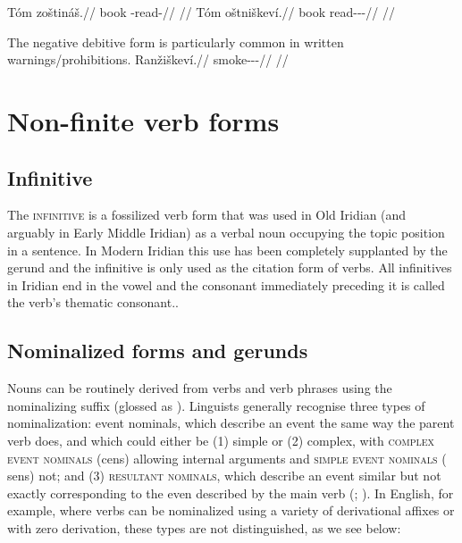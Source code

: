 \begin{multicols}{2}
  \pex
  \a
  \begingl
  \gla Tóm zoštináš.//
  \glb book \Neg{}-read-\SupN{}//
  \glft {}//
  \endgl
  \a \begingl
  \gla Tóm oštniškeví.//
  \glb book read-\Pv{}-\N{}\Deb{}-\Cont{}//
  \glft {}//
  \endgl
  \xe
\end{multicols}

The negative debitive form is particularly common in written warnings/prohibitions.
\pex \begingl
  \gla Ranžiškeví.//
  \glb smoke-\Av{}-\N{}\Deb{}-\Cont{}//
  \glft {}//
  \endgl
\xe


\section{Non-finite verb forms}

\subsection{Infinitive}\label{sec:infinitive}

The {\scshape infinitive} is a fossilized verb form that was used in Old
Iridian (and arguably in Early Middle Iridian) as a verbal noun occupying the topic position in a
sentence. In Modern Iridian this use has been completely supplanted by the
gerund and the infinitive is only used as the citation
form of verbs. All infinitives in Iridian end in the vowel
 and the consonant immediately preceding it is called the verb's
thematic consonant..

\subsection{Nominalized forms and
gerunds}\label{nom-morph}

Nouns can be routinely derived from verbs and verb phrases using the
nominalizing suffix  (glossed as \Nz{}). Linguists generally recognise
three types of nominalization: event nominals, which describe an event the same
way the parent verb does, and which could either be (1) simple or (2) complex,
with {\scshape complex event nominals} ({\sc cen}s) allowing
internal arguments and {\scshape simple event nominals} ({\sc
sen}s) not; and (3) {\scshape resultant
nominals}, which describe an event similar
but not exactly corresponding to the even described by the main verb
(\cite{grimshaw1990}; \cite{moulton2014}). In English, for
example, where verbs can be nominalized using a variety of derivational affixes
or with zero derivation, these types are not distinguished, as we see below:

